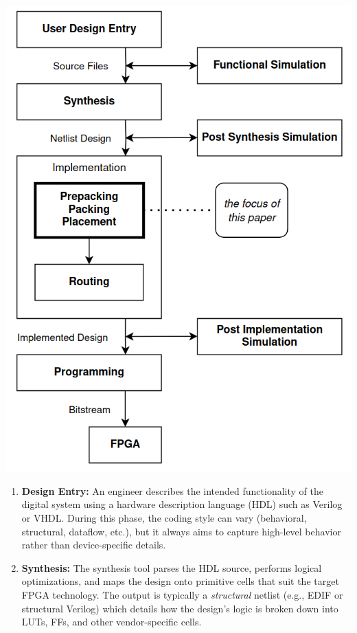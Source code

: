 \documentclass{article}
\begin{document}
\begin{multicols}{2}
    {
        \centering
        \includegraphics[width=0.9\columnwidth]{figures/design_flow.png}
        \label{fig:design_flow}
    }

    \begin{enumerate}
        \item \textbf{Design Entry:} 
            An engineer describes the intended functionality of the digital system using a hardware description language (HDL) such as Verilog or VHDL. 
            During this phase, the coding style can vary (behavioral, structural, dataflow, etc.), but it always aims to capture high-level behavior rather than device-specific details.

        \item \textbf{Synthesis:} 
            The synthesis tool parses the HDL source, performs logical optimizations, and maps the design onto primitive cells that suit the target FPGA technology. 
            The output is typically a \emph{structural} netlist (e.g., EDIF or structural Verilog) which details how the design’s logic is broken down into LUTs, FFs, and other vendor-specific cells.


\end{enumerate}
\end{multicols}
\end{document}
